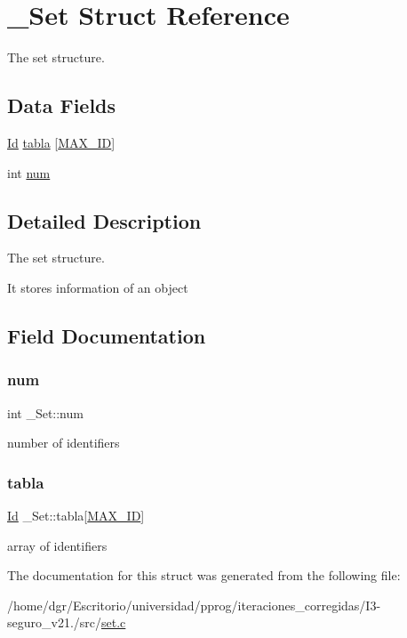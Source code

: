 \hypertarget{struct__Set}{}\section{\+\_\+\+Set Struct Reference}
\label{struct__Set}


The set structure.  


\subsection*{Data Fields}
\begin{DoxyCompactItemize}
\item 
\hyperlink{types_8h_a845e604fb28f7e3d97549da3448149d3}{Id} \hyperlink{struct__Set_a54767c55da685696938857775301eaf0}{tabla} \mbox{[}\hyperlink{set_8c_a1cdef4472847c938fc165b7d2737c4e4}{M\+A\+X\+\_\+\+ID}\mbox{]}
\item 
int \hyperlink{struct__Set_a0695075759bf06cffe79a8c3d8bfcfed}{num}
\end{DoxyCompactItemize}


\subsection{Detailed Description}
The set structure. 

It stores information of an object 

\subsection{Field Documentation}
\mbox{\label{struct__Set_a0695075759bf06cffe79a8c3d8bfcfed}} 
\subsubsection{\texorpdfstring{num}{num}}
{\footnotesize\ttfamily int \+\_\+\+Set\+::num}

number of identifiers \mbox{\label{struct__Set_a54767c55da685696938857775301eaf0}} 
\subsubsection{\texorpdfstring{tabla}{tabla}}
{\footnotesize\ttfamily \hyperlink{types_8h_a845e604fb28f7e3d97549da3448149d3}{Id} \+\_\+\+Set\+::tabla\mbox{[}\hyperlink{set_8c_a1cdef4472847c938fc165b7d2737c4e4}{M\+A\+X\+\_\+\+ID}\mbox{]}}

array of identifiers 

The documentation for this struct was generated from the following file\+:\begin{DoxyCompactItemize}
\item 
/home/dgr/\+Escritorio/universidad/pprog/iteraciones\+\_\+corregidas/\+I3-\/seguro\+\_\+v21./src/\hyperlink{set_8c}{set.\+c}\end{DoxyCompactItemize}
